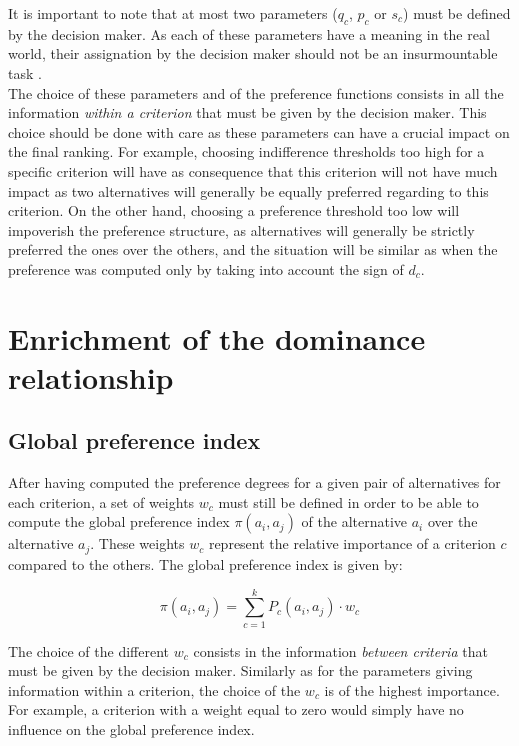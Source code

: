 It is important to note that at most two parameters ($q_c$, $p_c$ or $s_c$) must be defined by the decision maker. As each of these parameters have a meaning in the real world, their assignation by the decision maker should not be an insurmountable task \cite{Brans2016}. \\
The choice of these parameters and of the preference functions consists in all the information \textit{within a criterion} \cite{Brans2016} that must be given by the decision maker.
This choice should be done with care as these parameters can have a crucial impact on the final ranking.
For example, choosing indifference thresholds too high for a specific criterion will have as consequence that this criterion will not have much impact as two alternatives will generally be equally preferred regarding to this criterion.
On the other hand, choosing a preference threshold too low will impoverish the preference structure, as alternatives will generally be strictly preferred the ones over the others, and the situation will be similar as when the preference was computed only by taking into account the sign of $d_c$.

\section{Enrichment of the dominance relationship} \label{sec:enrichment_dominance_relation}
\subsection { Global preference index} \label{subsec:global_pref_index}

After having computed the preference degrees for a given pair of alternatives for each criterion, a set of weights $w_c$ must still be defined in order to be able to compute the global preference index $\pi(a_i,a_j)$ of the alternative $a_i$ over the alternative $a_j$.
These weights $w_c$ represent the relative importance of a criterion $c$ compared to the others. The global preference index is given by:

\begin{equation}
    \pi(a_i,a_j) = \sum\limits^k_{c=1} P_c(a_i,a_j)\cdot w_c
    \label{eq:global_preference_index}
\end{equation}

The choice of the different $w_c$ consists in the information \textit{between criteria} \cite{Brans2016} that must be given by the decision maker.
Similarly as for the parameters giving information within a criterion, the choice of the $w_c$ is of the highest importance. For example, a criterion with a weight equal to zero would simply have no influence on the global preference index.

